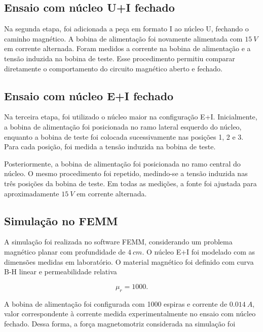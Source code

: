 \documentclass[11pt,a4paper]{article}
\begin{document}
\subsection{Ensaio com núcleo U+I fechado}

Na segunda etapa, foi adicionada a peça em formato I ao núcleo U, fechando o caminho magnético. A bobina de alimentação foi novamente alimentada com \(\SI{15}{V}\) em corrente alternada. Foram medidos a corrente na bobina de alimentação e a tensão induzida na bobina de teste. Esse procedimento permitiu comparar diretamente o comportamento do circuito magnético aberto e fechado.

\subsection{Ensaio com núcleo E+I fechado}

Na terceira etapa, foi utilizado o núcleo maior na configuração E+I. Inicialmente, a bobina de alimentação foi posicionada no ramo lateral esquerdo do núcleo, enquanto a bobina de teste foi colocada sucessivamente nas posições 1, 2 e 3. Para cada posição, foi medida a tensão induzida na bobina de teste.

Posteriormente, a bobina de alimentação foi posicionada no ramo central do núcleo. O mesmo procedimento foi repetido, medindo-se a tensão induzida nas três posições da bobina de teste. Em todas as medições, a fonte foi ajustada para aproximadamente \(\SI{15}{V}\) em corrente alternada.

\subsection{Simulação no FEMM}

A simulação foi realizada no software FEMM, considerando um problema magnético planar com profundidade de \(\SI{4}{cm}\). O núcleo E+I foi modelado com as dimensões medidas em laboratório. O material magnético foi definido com curva B-H linear e permeabilidade relativa

\begin{equation} 
    \mu_r = 1000 . 
    \label{eq:mur_femm} 
\end{equation}

A bobina de alimentação foi configurada com \num{1000} espiras e corrente de \(\SI{0,014}{A}\), valor correspondente à corrente medida experimentalmente no ensaio com núcleo fechado. Dessa forma, a força magnetomotriz considerada na simulação foi
\end{document}
